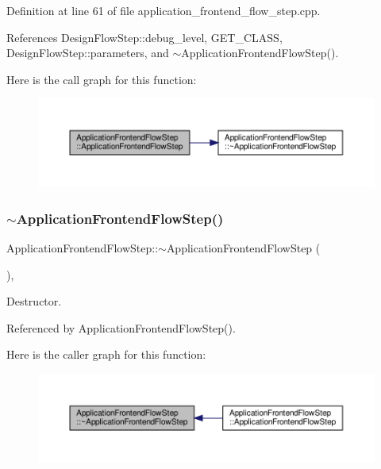 Definition at line 61 of file application\+\_\+frontend\+\_\+flow\+\_\+step.\+cpp.



References Design\+Flow\+Step\+::debug\+\_\+level, G\+E\+T\+\_\+\+C\+L\+A\+SS, Design\+Flow\+Step\+::parameters, and $\sim$\+Application\+Frontend\+Flow\+Step().

Here is the call graph for this function\+:
\nopagebreak
\begin{figure}[H]
\begin{center}
\leavevmode
\includegraphics[width=350pt]{d7/d7f/classApplicationFrontendFlowStep_adb51f03c4fcfca82c538cd88b3d4ff1e_cgraph}
\end{center}
\end{figure}
\mbox{\label{classApplicationFrontendFlowStep_a051a5d4690aa304214b13f0ffd1c5bee}} 
\subsubsection{\texorpdfstring{$\sim$\+Application\+Frontend\+Flow\+Step()}{~ApplicationFrontendFlowStep()}}
{\footnotesize\ttfamily Application\+Frontend\+Flow\+Step\+::$\sim$\+Application\+Frontend\+Flow\+Step (\begin{DoxyParamCaption}{ }\end{DoxyParamCaption})\hspace{0.3cm}{\ttfamily [override]}, {\ttfamily [default]}}



Destructor. 



Referenced by Application\+Frontend\+Flow\+Step().

Here is the caller graph for this function\+:
\nopagebreak
\begin{figure}[H]
\begin{center}
\leavevmode
\includegraphics[width=350pt]{d7/d7f/classApplicationFrontendFlowStep_a051a5d4690aa304214b13f0ffd1c5bee_icgraph}
\end{center}
\end{figure}


